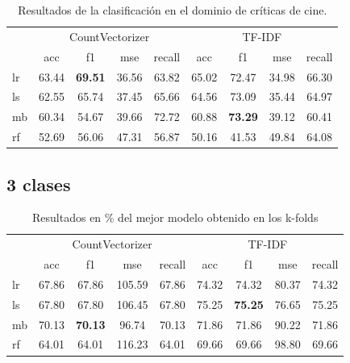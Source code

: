 \begin{table}[H]
	\centering
	\begin{tabular}{|l|cccc|cccc|}
		\hline
		& \multicolumn{4}{c|}{CountVectorizer} & \multicolumn{4}{c|}{TF-IDF} \\
		\cline{2-9}
		&    acc &     f1 &    mse &  recall & acc &     f1 &    mse &  recall \\
		\hline
		lr      &  63.44 &  \textbf{69.51} &  36.56 &   63.82 &  65.02 &  72.47 &  34.98 &   66.30 \\
		ls      &  62.55 &  65.74 &  37.45 &   65.66 &  64.56 &  73.09 &  35.44 &   64.97 \\
		mb      &  60.34 &  54.67 &  39.66 &   72.72 &  60.88 &  \textbf{73.29} &  39.12 &   60.41 \\
		rf      &  52.69 &  56.06 &  47.31 &   56.87 &  50.16 &  41.53 &  49.84 &   64.08 \\
		\hline
	\end{tabular}
	\caption{Resultados de la clasificación en el dominio de críticas de cine.}
	\label{result-cv-test-cine}
\end{table}

\subsection{3 clases}

\begin{table}[H]
	\centering
	\begin{tabular}{|l|cccc|cccc|}
		\hline
		& \multicolumn{4}{c|}{CountVectorizer} & \multicolumn{4}{c|}{TF-IDF} \\
		\cline{2-9}
		&    acc &     f1 &    mse &  recall & acc &     f1 &    mse &  recall \\
		\hline
		lr      &  67.86 &  67.86 &  105.59 &   67.86 &  74.32 &  74.32 &  80.37 &   74.32 \\
		ls      &  67.80 &  67.80 &  106.45 &   67.80 &  75.25 &  \textbf{75.25} &  76.65 &   75.25 \\
		mb      &  70.13 &  \textbf{70.13} &   96.74 &   70.13 &  71.86 &  71.86 &  90.22 &   71.86 \\
		rf      &  64.01 &  64.01 &  116.23 &   64.01 &  69.66 &  69.66 &  98.80 &   69.66 \\
		\hline
	\end{tabular}
	\caption{Resultados en \% del mejor modelo obtenido en los k-folds}
	\label{result-cv-test-3-clases}
\end{table}

